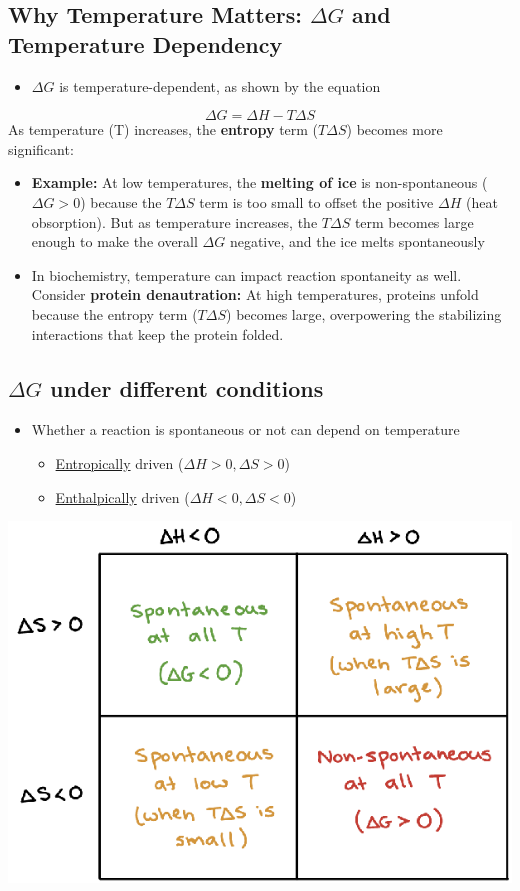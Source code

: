 \documentclass[10pt]{article}
\begin{document}
\subsection*{Why Temperature Matters: $\Delta G$ and Temperature Dependency}
\begin{itemize}
    \item $\Delta G$ is temperature-dependent, as shown by the equation
\end{itemize}
\[\Delta G = \Delta H - T\Delta S\]
As temperature (T) increases, the \textbf{entropy} term ($T\Delta S$) becomes more significant:
\begin{itemize}
    \item \textbf{Example:} At low temperatures, the \textbf{melting of ice} is non-spontaneous ($\Delta G > 0$) because the $T \Delta S$ term is too small to offset the positive $\Delta H$ (heat obsorption).  But as temperature increases, the $T \Delta S$ term becomes large enough to make the overall $\Delta G$ negative, and the ice melts spontaneously
    \item In biochemistry, temperature can impact reaction spontaneity as well.  Consider \textbf{protein denautration:} At high temperatures, proteins unfold because the entropy term ($T \Delta S$) becomes large, overpowering the stabilizing interactions that keep the protein folded.
\end{itemize}
\subsection*{$\Delta G$ under different conditions}
\begin{itemize}
    \item Whether a reaction is spontaneous or not can depend on temperature
    \begin{itemize}
        \item \underline{Entropically} driven ($\Delta H > 0, \Delta S > 0$)
        \item \underline{Enthalpically} driven ($\Delta H < 0, \Delta S < 0$)
    \end{itemize}
\end{itemize}
\begin{center}
    \includegraphics[scale=0.9]{L4_1.png}
\end{center}
\end{document}
